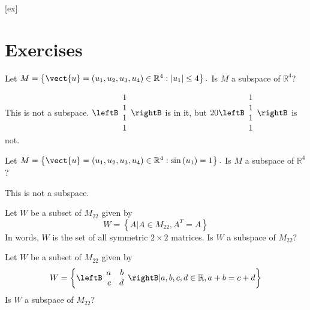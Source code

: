 [ex]
\section*{Exercises}

\begin{enumialphparenastyle}

\begin{ex} Let $M=\left\{ \vect{u}=\left( u_{1},u_{2},u_{3},u_{4}\right) \in 
\mathbb{R}^{4}:\left| u_{1}\right| \leq 4\right\} .$ Is $M$ a subspace of $\mathbb{R}^4$?
\begin{sol}
This is not a subspace. $\leftB \begin{array}{r}
1 \\
1 \\
1 \\
1
\end{array}
\rightB $ is in
it, but $20\leftB 
\begin{array}{r}
1 \\
1 \\
1 \\
1
\end{array}
\rightB $ is not. 
\end{sol}
\end{ex}

\begin{ex} Let $M=\left\{ \vect{u}=\left( u_{1},u_{2},u_{3},u_{4}\right) \in 
\mathbb{R}^{4}:\sin \left( u_{1}\right) =1\right\} .$ Is $M$ a subspace of $\mathbb{R}^4$?
\begin{sol}
This is not a subspace.
\end{sol}
\end{ex}

\begin{ex} Let $W$ be a subset of $M_{22}$ given by 
\[
W = \left\{ A | A \in M_{22}, A^T = A \right\}  
\]
In words, $W$ is the set of all symmetric $2 \times 2$ matrices. Is $W$ a subspace of $M_{22}$?
\end{ex}

\begin{ex} Let $W$ be a subset of $M_{22}$ given by 
\[
W = \left\{ \leftB \begin{array}{rr}
a  & b \\
c & d 
\end{array} \rightB | a,b,c,d \in \mathbb{R}, a + b = c + d \right\}
\]
Is $W$ a subspace of $M_{22}$?
\end{ex}


\end{enumialphparenastyle}
